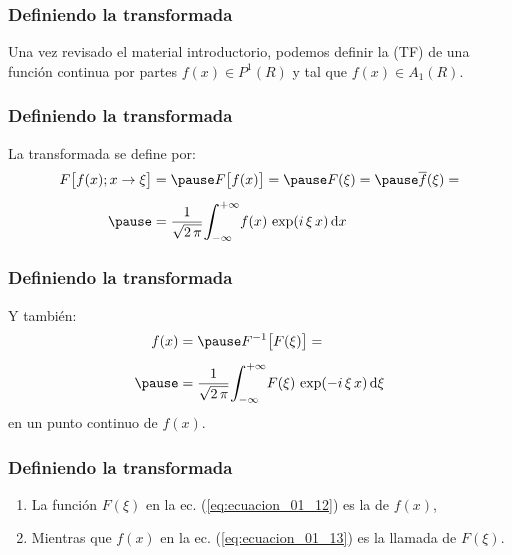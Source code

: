 \begin{frame}
\frametitle{Definiendo la transformada}
Una vez revisado el material introductorio, \pause podemos definir la  (TF) de una función continua por partes $f (x) \in P^{1} (R)$ y tal que $f (x) \in A_{1} (R)$.
\end{frame}
\begin{frame}
\frametitle{Definiendo la transformada}
La transformada se define por:
\pause
\begin{eqnarray}
\begin{aligned}[b]
F \big[ f (x); x \to \xi \big] &= \pause F \big[ f (x) \big] = \pause F (\xi) = \pause \overline{f} (\xi) = \\[0.5em] \pause
&= \dfrac{1}{\sqrt{2 \, \pi}} \scaleint{6ex}_{\bs -\infty}^{+\infty} f (x) \, \exp(i \, \xi \, x) \dd{x}
\end{aligned}
\label{eq:ecuacion_01_12}
\end{eqnarray}
\end{frame}
\begin{frame}
\frametitle{Definiendo la transformada}
Y también:
\pause
\begin{eqnarray}
\begin{aligned}[b]
f (x) &= \pause F^{-1} \big[ F (\xi) \big] = \\[0.5em] \pause
&= \dfrac{1}{\sqrt{2 \, \pi}} \scaleint{6ex}_{\bs -\infty}^{+\infty} F (\xi) \, \exp(-i \, \xi \, x) \dd{\xi}
\label{eq:ecuacion_01_13}
\end{aligned}
\end{eqnarray}
en un punto continuo de $f (x)$.
\end{frame}
\begin{frame}
\frametitle{Definiendo la transformada}
\begin{enumerate}[<+->]
\item La función $F (\xi)$ en la ec. (\ref{eq:ecuacion_01_12}) es la  de $f (x)$,
\item Mientras que $f (x)$ en la ec. (\ref{eq:ecuacion_01_13}) es la llamada  de $F (\xi)$.
\end{enumerate}
\end{frame}
